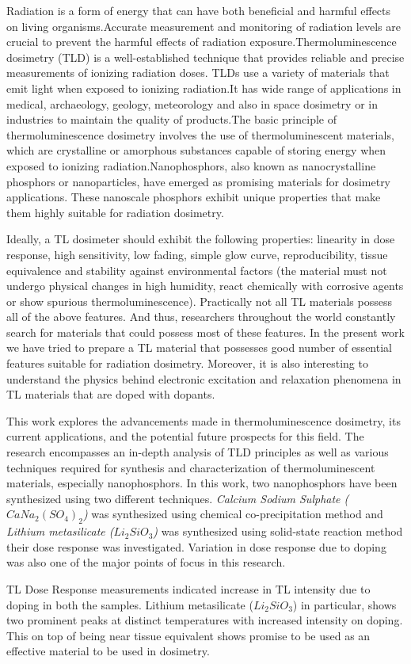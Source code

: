 \documentclass[../Report.tex]{subfiles}
\begin{document}
    Radiation is a form of energy that can have both beneficial and harmful effects on living organisms.Accurate measurement
    and monitoring of radiation levels are crucial to prevent the harmful effects of radiation exposure.Thermoluminescence dosimetry
    (TLD) is a well-established technique that provides reliable and precise measurements of ionizing radiation
    doses. TLDs use a variety of materials that emit light when exposed to ionizing radiation.It has wide range of 
    applications in medical, archaeology, geology, meteorology and also in space dosimetry or in industries to 
    maintain the quality of products.The basic principle of thermoluminescence dosimetry involves the use of 
    thermoluminescent materials, which are crystalline or amorphous substances capable of storing energy when 
    exposed to ionizing radiation.Nanophosphors, also known as nanocrystalline phosphors or nanoparticles, have 
    emerged as promising materials for dosimetry applications. These nanoscale phosphors exhibit unique properties 
    that make them highly suitable for radiation dosimetry.

    Ideally, a TL dosimeter should exhibit the following properties: linearity in dose response, high sensitivity, 
    low fading, simple glow curve, reproducibility, tissue equivalence and stability against environmental factors 
    (the material must not undergo physical changes in high humidity, react chemically with corrosive agents or 
    show spurious thermoluminescence). Practically not all TL materials possess all of the above features. And thus, 
    researchers throughout the world constantly search for materials that could possess most of these features. In 
    the present work we have tried to prepare a TL material that possesses good number of essential features suitable 
    for radiation dosimetry. Moreover, it is also interesting to understand the physics behind electronic excitation 
    and relaxation phenomena in TL materials that are doped with dopants.

    This work explores the advancements made in thermoluminescence dosimetry, its current applications, and the 
    potential future prospects for this field. The research encompasses an in-depth analysis of TLD principles as 
    well as various techniques required for synthesis and characterization of thermoluminescent materials, 
    especially nanophosphors. In this work, two nanophosphors have been synthesized using two different techniques.
    \textit{Calcium Sodium Sulphate ($CaNa_2{(SO_4)}_2$)} was synthesized using chemical co-precipitation method and 
    \textit{Lithium metasilicate ($Li_2SiO_3$)} was synthesized using solid-state reaction method their dose response 
    was investigated. Variation in dose response due to doping was also one of the major points of focus in this research.
   
    TL Dose Response measurements indicated increase in TL intensity due to doping in both the samples. Lithium 
    metasilicate ($Li_2SiO_3$) in particular, shows two prominent peaks at distinct temperatures with increased 
    intensity on doping. This on top of being near tissue equivalent shows promise to be used as an effective material 
    to be used in dosimetry.
\end{document}
